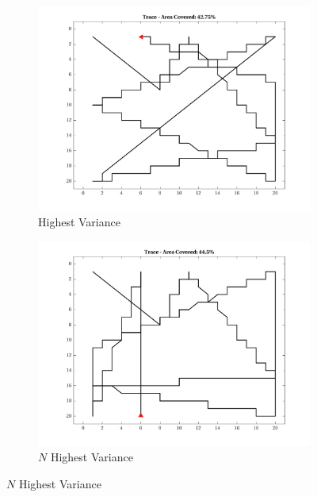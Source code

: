 \begin{figure}[htb!]
    \centering
    \begin{subfigure}[t]{0.3333\textwidth}
        \centering
        \includegraphics[width=\linewidth]{figures/hbresults/path_nhv_40p_20x20_sf_4_seed_2.png}
        \ssp
        \captionsetup{skip=0.20\baselineskip,size=footnotesize}
        \caption{Highest Variance}
    \end{subfigure}%
    \begin{subfigure}[t]{0.3333\textwidth}
        \centering
        \includegraphics[width=\linewidth]{figures/hbresults/path_nnhv_40p_20x20_sf_4_seed_2.png}
        \ssp
        \captionsetup{skip=0.20\baselineskip,size=footnotesize}
        \caption{$N$ Highest Variance}

\end{subfigure}
\end{figure}
